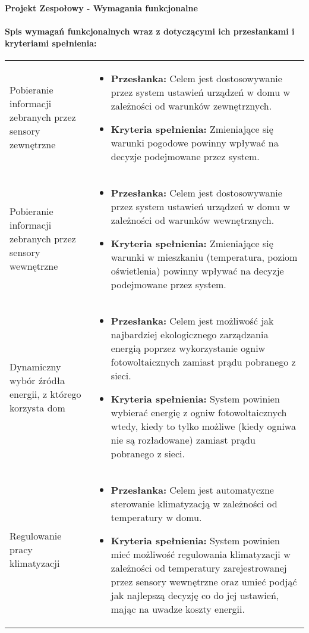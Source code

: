 \documentclass{article}
\begin{document}
\begin{center}
\textbf{Projekt Zespołowy - Wymagania funkcjonalne}
\end{center}

\paragraph{Spis wymagań funkcjonalnych wraz z dotyczącymi ich przesłankami i kryteriami spełnienia:}
\begin{center}
{\def\arraystretch{3}\tabcolsep=5pt
	\begin{longtable}{p{5cm}p{10cm}}
	
	Pobieranie informacji zebranych przez sensory zewnętrzne&
	\begin{itemize}
	\item \textbf{Przesłanka:} Celem jest dostosowywanie przez system ustawień urządzeń w domu w zależności od warunków zewnętrznych.
	\item \textbf{Kryteria spełnienia:} Zmieniające się warunki pogodowe powinny wpływać na decyzje podejmowane przez system.
	\end{itemize}\\
	
	Pobieranie informacji zebranych przez sensory wewnętrzne&
	\begin{itemize}
	\item \textbf{Przesłanka:} Celem jest dostosowywanie przez system ustawień urządzeń w domu w zależności od warunków wewnętrznych.
	\item \textbf{Kryteria spełnienia:} Zmieniające się warunki w mieszkaniu (temperatura, poziom oświetlenia) powinny wpływać na decyzje podejmowane przez system.
	\end{itemize}\\
	
	Dynamiczny wybór źródła energii, z którego korzysta dom&
	\begin{itemize}
	\item \textbf{Przesłanka:} Celem jest możliwość jak najbardziej ekologicznego zarządzania energią poprzez wykorzystanie ogniw fotowoltaicznych zamiast prądu pobranego z sieci.
	\item \textbf{Kryteria spełnienia:} System powinien wybierać energię z ogniw fotowoltaicznych wtedy, kiedy to tylko możliwe (kiedy ogniwa nie są rozładowane) zamiast prądu pobranego z sieci.
	\end{itemize}\\
	
	Regulowanie pracy klimatyzacji&
	\begin{itemize}
	\item \textbf{Przesłanka:} Celem jest automatyczne sterowanie klimatyzacją w zależności od temperatury w domu.
	\item \textbf{Kryteria spełnienia:} System powinien mieć możliwość regulowania klimatyzacji w zależności od temperatury zarejestrowanej przez sensory wewnętrzne oraz umieć podjąć jak najlepszą decyzję co do jej ustawień, mając na uwadze koszty energii.
	\end{itemize}\\
	

\end{longtable}}
\end{center}
\end{document}
